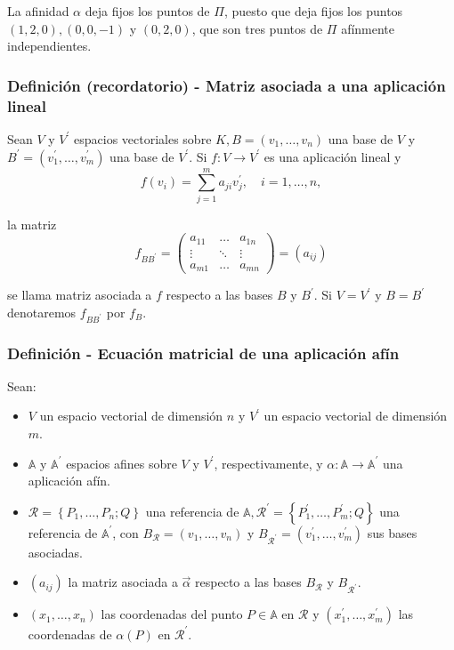 \documentclass[12pt, a4paper, ones, notitlepage, openany,titlepage]{article}
\begin{document}
La afinidad $\alpha$ deja fijos los puntos de $\Pi$, puesto que deja fijos los puntos $(1,2,0),(0,0,-1)$ y $(0,2,0)$, que son tres puntos de $\Pi$ afínmente independientes.

\subsubsection{Definición (recordatorio) - Matriz asociada a una aplicación lineal} Sean $V$ y $V^{\prime}$ espacios vectoriales sobre $K, B=\left(v_{1}, \ldots, v_{n}\right)$ una base de $V$ y $B^{\prime}=\left(v_{1}^{\prime}, \ldots, v_{m}^{\prime}\right)$ una base de $V^{\prime}$. Si $f: V \rightarrow V^{\prime}$ es una aplicación lineal y
$$
f\left(v_{i}\right)=\sum_{j=1}^{m} a_{j i} v_{j}^{\prime}, \quad i=1, \ldots, n,
$$

\noindent la matriz
$$
f_{B B^{\prime}}=\left(\begin{array}{rrr}
a_{11} & \ldots & a_{1 n} \\
\vdots & \ddots & \vdots \\
a_{m 1} & \ldots & a_{m n}
\end{array}\right)=\left(a_{i j}\right)
$$

se llama matriz asociada a $f$ respecto a las bases $B$ y $B^{\prime}$. Si $V=V^{\prime}$ y $B=B^{\prime}$ denotaremos $f_{B B^{\prime}}$ por $f_{B}$.

\subsubsection{Definición - Ecuación matricial de una aplicación afín} \noindent Sean:
\begin{itemize}

\item$V$ un espacio vectorial de dimensión $n$ y $V^{\prime}$ un espacio vectorial de dimensión $m$.
\item$\mathbb{A}$ y $\mathbb{A}^{\prime}$ espacios afines sobre $V$ y $V^{\prime}$, respectivamente, y $\alpha: \mathbb{A} \rightarrow \mathbb{A}^{\prime}$ una aplicación afín.
\item$\mathcal{R}=\left\{P_{1}, \ldots, P_{n} ; Q\right\}$ una referencia de $\mathbb{A}, \mathcal{R}^{\prime}=\left\{P_{1}^{\prime}, \ldots, P_{m}^{\prime} ; Q\right\}$ una referencia de $\mathbb{A}^{\prime}$, con $B_{\mathcal{R}}=\left(v_{1}, \ldots, v_{n}\right)$ y $B_{\mathcal{R}^{\prime}}=\left(v_{1}^{\prime}, \ldots, v_{m}^{\prime}\right)$ sus bases asociadas.

\item$\left(a_{i j}\right)$ la matriz asociada a $\vec{\alpha}$ respecto a las bases $B_{\mathcal{R}}$ y $B_{\mathcal{R}^{\prime}}$. \item$\left(x_{1}, \ldots, x_{n}\right)$ las coordenadas del punto $P \in \mathbb{A}$ en $\mathcal{R}$ y $\left(x_{1}^{\prime}, \ldots, x_{m}^{\prime}\right)$ las coordenadas de $\alpha(P)$ en $\mathcal{R}^{\prime}$.

\end{itemize}
\end{document}
